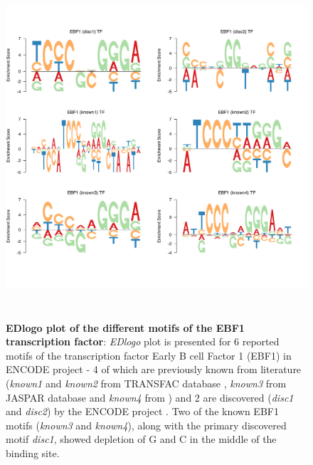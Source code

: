 \documentclass{bmcart}
\begin{document}
\begin{figure}[h!]
\centering
\includegraphics[height=5in, width=5in]{suppfig/Figure2.pdf}
\caption{\textbf{EDlogo plot of the different motifs of the EBF1 transcription factor}:  \textit{EDlogo} plot is presented for 6 reported motifs of the transcription factor Early B cell Factor 1 (EBF1) in ENCODE project - 4 of which are previously known from literature (\textit{known1} and \textit{known2} from TRANSFAC database \cite{Wingender2000}, \textit{known3} from  JASPAR database \cite{Sandelin2004} and \textit{known4} from \cite{Jolma2013}) and 2 are discovered (\textit{disc1} and \textit{disc2}) by the ENCODE project \cite{Kheradpour2013}.  Two of the known EBF1 motifs (\textit{known3} and \textit{known4}), along with the primary discovered motif \textit{disc1},  showed depletion of G and C in the middle of the binding site.}
\label{fig:suppfig2}
\end{figure}
\end{document}
